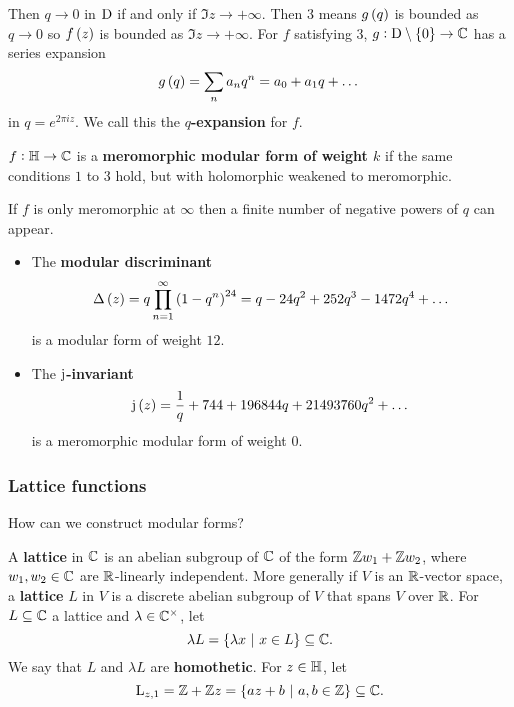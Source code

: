 Then $ q \to 0 $ in $ \mathrm{D} $ if and only if $ \Im z \to +\infty $. Then $ 3 $ means $ g\br{q} $ is bounded as $ q \to 0 $ so $ f\br{z} $ is bounded as $ \Im z \to +\infty $. For $ f $ satisfying $ 3 $, $ g : \D \setminus \cbr{0} \to \CC $ has a series expansion
$$ g\br{q} = \sum_n a_nq^n = a_0 + a_1q + \dots $$
in $ q = e^{2\pi iz} $. We call this the \textbf{$ q $-expansion} for $ f $.


\begin{definition}
$ f : \mathbb{H} \to \mathbb{C} $ is a \textbf{meromorphic modular form of weight $ k $} if the same conditions $ 1 $ to $ 3 $ hold, but with holomorphic weakened to meromorphic.
\end{definition}

\begin{note*}
If $ f $ is only meromorphic at $ \infty $ then a finite number of negative powers of $ q $ can appear.
\end{note*}

\begin{example*}
\hfill
\begin{itemize}
\item The \textbf{modular discriminant}
$$ \Delta\br{z} = q\prod_{n = 1}^\infty \br{1 - q^n}^{24} = q - 24q^2 + 252q^3 - 1472q^4 + \dots $$
is a modular form of weight $ 12 $.
\item The \textbf{$ \mathrm{j} $-invariant}
$$ \j\br{z} = \dfrac{1}{q} + 744 + 196844q + 21493760q^2 + \dots $$
is a meromorphic modular form of weight $ 0 $.
\end{itemize}
\end{example*}

\pagebreak

\subsubsection{Lattice functions}

How can we construct modular forms?

\begin{definition}
A \textbf{lattice} in $ \mathbb{C} $ is an abelian subgroup of $ \mathbb{C} $ of the form $ \mathbb{Z} w_1 + \mathbb{Z} w_2 $, where $ w_1, w_2 \in \mathbb{C} $ are $ \mathbb{R} $-linearly independent. More generally if $ V $ is an $ \mathbb{R} $-vector space, a \textbf{lattice} $ L $ in $ V $ is a discrete abelian subgroup of $ V $ that spans $ V $ over $ \mathbb{R} $. For $ L \subseteq \mathbb{C} $ a lattice and $ \lambda \in \mathbb{C}^\times $, let
$$ \lambda L = \cbr{\lambda x \st x \in L} \subseteq \CC. $$
We say that $ L $ and $ \lambda L $ are \textbf{homothetic}. For $ z \in \mathbb{H} $, let
$$ \L_{z, 1} = \ZZ + \ZZ z = \cbr{az + b \st a, b \in \ZZ} \subseteq \CC. $$
\end{definition}

